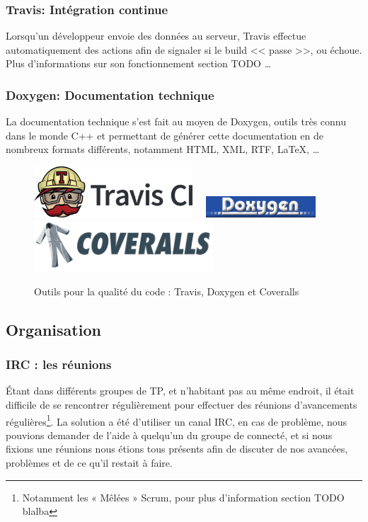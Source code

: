 \subsubsection{Travis: Intégration continue}
Lorsqu'un développeur envoie des données au serveur, Travis effectue automatiquement des actions afin de signaler si le build << passe >>,
ou échoue. Plus d'informations sur son fonctionnement section TODO \ldots

\subsubsection{Doxygen: Documentation technique}
La documentation technique s'est fait au moyen de Doxygen, outils très connu dans le monde C++ et permettant de générer cette documentation
en de nombreux formats différents, notamment HTML, XML, RTF, \LaTeX{}, \ldots

\begin{figure}[H]
	\centering
\includegraphics[height=1.9cm]{../beamer/logos/travis.png}~~
\includegraphics[height=0.8cm]{../beamer/logos/doxygen.png}~~
\includegraphics[height=1.9cm]{../beamer/logos/coveralls.png}
\caption{Outils pour la qualité du code : Travis, Doxygen et Coveralls}
\end{figure}
\subsection{Organisation}
\subsubsection{IRC : les réunions}
Étant dans différents groupes de TP, et n'habitant pas au même endroit, il était difficile de se rencontrer régulièrement pour effectuer des
réunions d'avancements régulières\footnote{Notamment les « Mêlées » Scrum, pour plus d'information section TODO blalba}. La solution a été
d'utiliser un canal IRC, en cas de problème, nous pouvions demander de l'aide à quelqu'un du groupe de connecté, et si nous fixions une
réunions nous étions tous présents afin de discuter de nos avancées, problèmes et de ce qu'il restait à faire.

